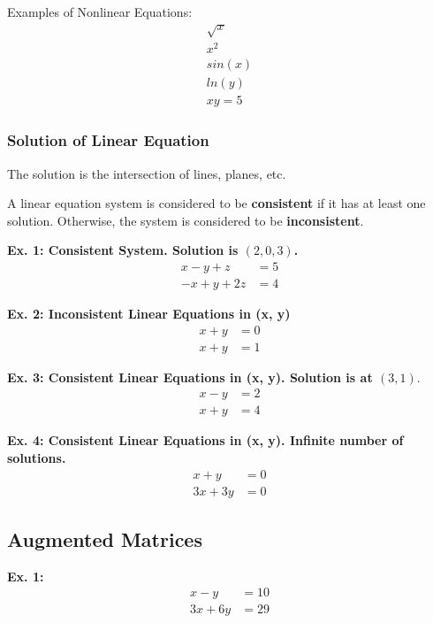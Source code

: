 \noindent
Examples of Nonlinear Equations:
\begin{align}
    \sqrt{x} \\
    x^2 \\
    sin(x) \\
    ln(y) \\
    xy = 5
\end{align}

\subsubsection{Solution of Linear Equation}
The solution is the intersection of lines, planes, etc.
\begin{definition}
    A linear equation system is considered to be \textbf{consistent} if it has at least one solution. Otherwise, the system is considered to be \textbf{inconsistent}.
\end{definition}

\noindent
\newline
\textbf{Ex. 1: Consistent System. Solution is \((2, 0, 3)\).}
\begin{align}
    x - y + z &= 5 \\
    -x + y + 2z &= 4
\end{align}

\noindent
\newline
\textbf{Ex. 2: Inconsistent Linear Equations in (x, y)}
\begin{align}
    x + y &= 0 \\
    x + y &= 1 
\end{align}

\noindent
\newline
\textbf{Ex. 3: Consistent Linear Equations in (x, y). Solution is at \((3, 1).\)}
\begin{align}
    x - y &= 2 \\
    x + y &= 4
\end{align}

\noindent
\newline
\textbf{Ex. 4: Consistent Linear Equations in (x, y). Infinite number of solutions.}
\begin{align}
    x + y &= 0 \\
    3x + 3y &= 0
\end{align}

\subsection{Augmented Matrices}
\textbf{Ex. 1:}
\begin{align}
    x - y &= 10 \\
    3x + 6y &= 29 
\end{align}

